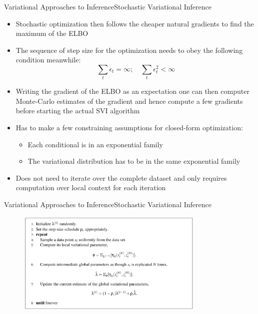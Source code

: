 \documentclass[AERbeamer%
              ,optEnglish%
              ,optBiber%
              ,optBibstyleAlphabetic%
              ,optBeamerClassicFormat%
              ]{AERlatex}%
\begin{document}
\begin{frame}[c]{Variational Approaches to Inference}{Stochastic Variational Inference}
    \centering
    \begin{itemize}
        \item Stochastic optimization then follows the cheaper natural gradients to find the maximum of the ELBO
        \item The sequence of step size for the optimization needs to obey the following condition meanwhile:
        \begin{equation*}
            \sum_{t} \epsilon_{t} = \infty; \quad \sum_{t} \epsilon^{2}_{t} < \infty
        \end{equation*}
        \item Writing the gradient of the ELBO as an expectation one can then computer Monte-Carlo estimates of the
              gradient and hence compute a few gradients before starting the actual SVI algorithm
        \item Has to make a few constraining assumptions for closed-form optimization:
        \begin{itemize}
            \item Each conditional is in an exponential family
            \item The variational distribution has to be in the same exponential family
        \end{itemize}
        \item Does not need to iterate over the complete dataset and only requires computation over local context for each iteration
    \end{itemize}
\end{frame}


\begin{frame}[c]{Variational Approaches to Inference}{Stochastic Variational Inference}
    \centering
    \begin{figure}
        \centering
        \includegraphics[width=0.8\textwidth]{VISVIAlgo.png}
    \end{figure}
\end{frame}
\end{document}
